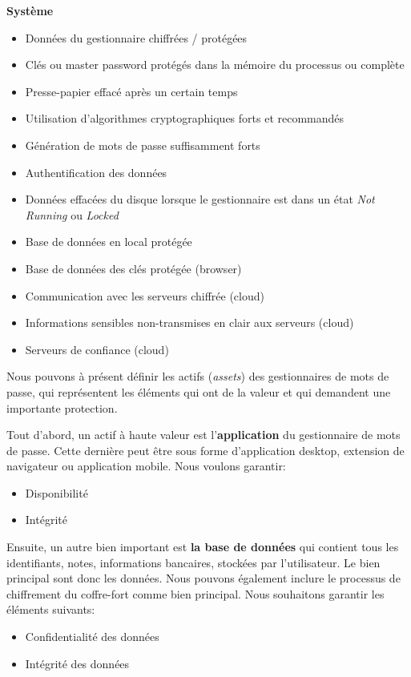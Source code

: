 \textbf{Système}
\begin{itemize}
	\item Données du gestionnaire chiffrées / protégées
	\item Clés ou master password protégés dans la mémoire du processus ou complète
	\item Presse-papier effacé après un certain temps
	\item Utilisation d'algorithmes cryptographiques forts et recommandés
	\item Génération de mots de passe suffisamment forts
	\item Authentification des données
	\item Données effacées du disque lorsque le gestionnaire est dans un état \textit{Not Running} ou \textit{Locked}
	\item Base de données en local protégée
	\item Base de données des clés protégée (browser)
	\item Communication avec les serveurs chiffrée (cloud)
	\item Informations sensibles non-transmises en clair aux serveurs (cloud)
	\item Serveurs de confiance (cloud)
\end{itemize}

Nous pouvons à présent définir les actifs (\textit{assets}) des gestionnaires de mots de passe, qui représentent les éléments qui ont de la valeur et qui demandent une importante protection. 

Tout d'abord, un actif à haute valeur est l'\textbf{application} du gestionnaire de mots de passe. Cette dernière peut être sous forme d'application desktop, extension de navigateur ou application mobile. Nous voulons garantir:
\begin{itemize}
	\item Disponibilité
	\item Intégrité
\end{itemize}

Ensuite, un autre bien important est \textbf{la base de données} qui contient tous les identifiants, notes, informations bancaires, stockées par l'utilisateur. Le bien principal sont donc les données. Nous pouvons également inclure le processus de chiffrement du coffre-fort comme bien principal. Nous souhaitons garantir les éléments suivants:
\begin{itemize}
	\item Confidentialité des données
	\item Intégrité des données
\end{itemize}


